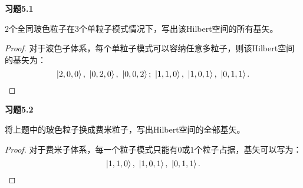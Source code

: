 \documentclass[reqno,a4paper,12pt]{amsart}
\begin{document}
\medskip

\textbf{习题5.1}

$2$个全同玻色粒子在$3$个单粒子模式情况下，写出该Hilbert空间的所有基矢。

\begin{proof}
对于波色子体系，每个单粒子模式可以容纳任意多粒子，则该Hilbert空间的基矢为：
\[
	\ket{2,0,0}, \ \ket{0,2,0}, \ \ket{0,0,2}; \ \ket{1,1,0}, \ \ket{1,0,1}, \ \ket{0,1,1}.
\]
\end{proof}

\medskip

\textbf{习题5.2}

将上题中的玻色粒子换成费米粒子，写出Hilbert空间的全部基矢。

\begin{proof}
对于费米子体系，每一个粒子模式只能有$0$或$1$个粒子占据，基矢可以写为：
\[
	\ket{1,1,0}, \ \ket{1,0,1}, \ \ket{0,1,1}.
\]
\end{proof}
\end{document}

